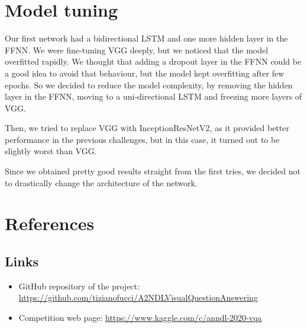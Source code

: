 \documentclass[12pt,a4paper]{report}
\begin{document}
\chapter{Model tuning}
Our first network had a bidirectional LSTM and one more hidden layer in the FFNN. We were fine-tuning VGG deeply, but we noticed that the model overfitted rapidly. We thought that adding a dropout layer in the FFNN could be a good idea to avoid that behaviour, but the model kept overfitting after few epochs.
 So we decided to reduce the model complexity, by removing the hidden layer in the FFNN, moving to a uni-directional LSTM and freezing more layers of VGG.

Then, we tried to replace VGG with InceptionResNetV2, as it provided better performance in the previous challenges, but in this case, it turned out to be slightly worst than VGG.

Since we obtained pretty good results straight from the first tries, we decided not to drastically change the architecture of the network.
	\chapter{References}
		\section{Links}

\begin{itemize}
	\item GitHub repository of the project: \url{https://github.com/tizianofucci/A2NDLVisualQuestionAnswering}
	\item Competition web page: \url{https://www.kaggle.com/c/anndl-2020-vqa}
\end{itemize}
\end{document}

